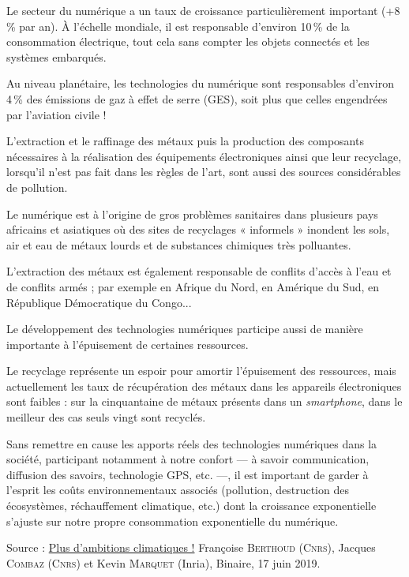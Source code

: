 \begin{jazzitemize}
\item Le secteur du numérique a un taux de croissance particulièrement important (+8\,\% par an). À l'échelle mondiale, il est responsable d’environ 10\,\% de la consommation électrique, tout cela sans compter les objets connectés et les systèmes embarqués.   
\item Au niveau planétaire, les technologies du numérique sont responsables d’environ 4\,\% des émissions de gaz à effet de serre (GES), soit plus que celles engendrées par l’aviation civile !
\item L’extraction et le raffinage des métaux puis la production des composants nécessaires à la réalisation des équipements électroniques ainsi que leur recyclage, lorsqu’il n’est pas fait dans les règles de l’art, sont aussi des sources considérables de pollution.
\item Le numérique est à l'origine de gros problèmes sanitaires dans plusieurs pays africains et asiatiques où des sites de recyclages « informels » inondent les sols, air et eau de métaux lourds et de substances chimiques très polluantes.
\item L'extraction des métaux est également responsable de conflits d'accès à l'eau et de conflits armés ; par exemple en Afrique du Nord, en Amérique du Sud, en République Démocratique du Congo...
\item Le développement des technologies numériques participe aussi de manière importante à l’épuisement de certaines ressources.
\item Le recyclage représente un espoir pour amortir l’épuisement des ressources, mais actuellement les taux de récupération des métaux dans les appareils électroniques sont faibles  : sur la cinquantaine de métaux présents dans un \textit{smartphone}, dans le meilleur des cas seuls vingt sont recyclés.
\item Sans remettre en cause les apports réels des technologies numériques dans la société, participant notamment à notre confort --- à savoir communication, diffusion des savoirs, technologie GPS, etc. ---, il est important de garder à l’esprit les coûts environnementaux associés (pollution, destruction des écosystèmes, réchauffement climatique, etc.) dont la croissance exponentielle s'ajuste sur notre propre consommation exponentielle du numérique.
\end{jazzitemize}

\noindent Source : \href{https://www.lemonde.fr/blog/binaire/2019/06/17/plus-d-ambitions-climatiques/}{Plus d’ambitions climatiques !} Françoise \textsc{Berthoud} (\textsc{Cnrs}), Jac\-ques \textsc{Combaz} (\textsc{Cnrs}) et Kevin \textsc{Marquet} (Inria), Binaire, 17 juin 2019.

